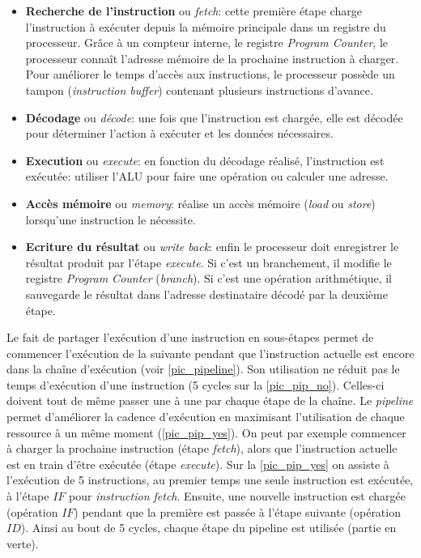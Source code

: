 \begin{itemize}
    \item \textbf{Recherche de l'instruction} ou \textit{fetch}: cette première étape charge l'instruction à exécuter depuis la mémoire principale dans un registre du processeur. Grâce à un compteur interne, le registre \textit{Program Counter}, le processeur connaît l'adresse mémoire de la prochaine instruction à charger. Pour améliorer le temps d'accès aux instructions, le processeur possède un tampon (\textit{instruction buffer}) contenant plusieurs instructions d'avance.
    \item \textbf{Décodage} ou \textit{décode}: une fois que l'instruction est chargée, elle est décodée pour déterminer l'action à exécuter et les données nécessaires.
    \item \textbf{Execution} ou \textit{execute}: en fonction du décodage réalisé, l'instruction est exécutée: utiliser l'ALU pour faire une opération ou calculer une adresse.
    \item \textbf{Accès mémoire} ou \textit{memory}: réalise un accès mémoire (\textit{load} ou \textit{store}) lorsqu'une instruction le nécessite.
    \item \textbf{Ecriture du résultat} ou \textit{write back}: enfin le processeur doit enregistrer le résultat produit par l'étape \textit{execute}. Si c'est un branchement, il modifie le registre \textit{Program Counter} (\textit{branch}). Si c'est une opération arithmétique, il sauvegarde le résultat dans l'adresse destinataire décodé par la deuxième étape.
\end{itemize}

Le fait de partager l'exécution d'une instruction en sous-étapes permet de commencer l'exécution de la suivante pendant que l'instruction actuelle est encore dans la chaîne d'exécution (voir \autoref{pic_pipeline}). Son utilisation ne réduit pas le temps d'exécution d'une instruction (5 cycles sur la \autoref{pic_pip_no}). Celles-ci doivent tout de même passer une à une par chaque étape de la chaîne. Le \textit{pipeline} permet d'améliorer la cadence d'exécution en maximisant l'utilisation de chaque ressource à un même moment (\autoref{pic_pip_yes}). On peut par exemple commencer à charger la prochaine instruction (étape \textit{fetch}), alors que l'instruction actuelle est en train d'être exécutée (étape \textit{execute}). Sur la \autoref{pic_pip_yes} on assiste à l'exécution de 5 instructions, au premier temps une seule instruction est exécutée, à l'étape $IF$ pour \textit{instruction fetch}. Ensuite, une nouvelle instruction est chargée (opération $IF$) pendant que la première est passée à l'étape suivante (opération $ID$). Ainsi au bout de 5 cycles, chaque étape du pipeline est utilisée (partie en verte). 


